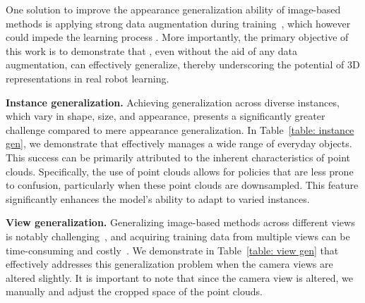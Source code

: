 One solution to improve the appearance generalization ability of image-based methods is applying strong data augmentation during training~\citep{hansen2022lfs,hansen2021svea}, which however could impede the learning process \citep{yuan2022pieg,hansen2021svea}. More importantly, the primary objective of this work is to demonstrate that \ours, even without the aid of any data augmentation, can effectively generalize, thereby underscoring the potential of 3D representations in real robot learning.





\textbf{Instance generalization.} Achieving generalization across diverse instances, which vary in shape, size, and appearance, presents a significantly greater challenge compared to mere appearance generalization. In Table~\ref{table: instance gen}, we demonstrate that \ours effectively manages a wide range of everyday objects. This success can be primarily attributed to the inherent characteristics of point clouds. Specifically, the use of point clouds allows for policies that are less prone to confusion, particularly when these point clouds are downsampled. This feature significantly enhances the model's ability to adapt to varied instances.





\textbf{View generalization.} Generalizing image-based methods across different views is notably challenging~\citep{yang2023movie}, and acquiring training data from multiple views can be time-consuming and costly~\citep{ze2023gnfactor,shen2023distilled}. We demonstrate in Table~\ref{table: view gen} that \ours effectively addresses this generalization problem when the camera views are altered slightly. It is important to note that since the camera view is altered, we manually  and adjust the cropped space of the point clouds. 




